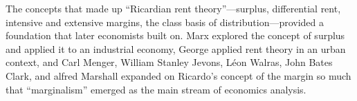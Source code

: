 The concepts that made up  ``Ricardian rent theory''---surplus, differential rent, intensive and extensive margins, the class basis of distribution---provided a foundation that later economists built on. Marx explored the concept of surplus and applied it  to an industrial economy, George applied rent theory in an urban context, and  Carl Menger, William Stanley Jevons, Léon Walras, John Bates Clark, and alfred Marshall expanded on Ricardo's concept of the margin so much that ``marginalism'' emerged as the main stream of economics analysis. 


